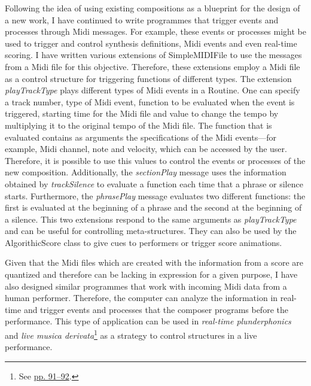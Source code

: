 Following the idea of using existing compositions as a blueprint for the design of a new work, I have continued to write programmes that trigger events and processes through Midi messages. For example, these events or processes might be used to trigger and control synthesis definitions, Midi events and even real-time scoring. I have written various extensions of SimpleMIDIFile to use the messages from a Midi file for this objective. Therefore, these extensions employ a Midi file as a control structure for triggering functions of different types.
The extension \emph{playTrackType} plays different types of Midi events in a Routine. One can specify a track number, type of Midi event, function to be evaluated when the event is triggered, starting time for the Midi file and  value to change the tempo by multiplying it to the original tempo of the Midi file. The function that is evaluated contains as arguments the specifications of the Midi events---for example, Midi channel, note and velocity, which can be accessed by the user. Therefore, it is possible to use this values to control the events or processes of the new composition. Additionally, the \emph{sectionPlay} message uses the information obtained by \emph{trackSilence} to evaluate a function each time that a phrase or silence starts. Furthermore, the \emph{phrasePlay} message evaluates two different functions: the first is evaluated at the beginning of a phrase and the second at the beginning of a silence. This two extensions respond to the same arguments as \emph{playTrackType} and can be useful for controlling meta-structures. They can also be used by the AlgorithicScore class to give cues to performers or trigger score animations. 
\hypertarget{miditrig}{}

Given that the Midi files which are created with the information from a score are quantized and therefore can be lacking in expression for a given purpose, I have also designed similar programmes that work with incoming Midi data from a human performer. Therefore, the computer can analyze the information in real-time and trigger events and processes that the composer programs before the performance. This type of application can be used in \emph{real-time plunderphonics} and \emph{live musica derivata}\footnote{See \hyperlink{realtimeplunderfuck}{pp. 91--92}.} as a strategy to control structures in a live performance.

\indent

